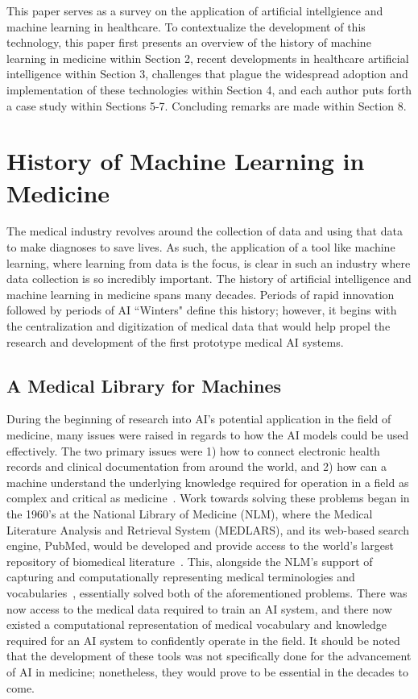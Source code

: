 \documentclass[a4paper]{article}
\begin{document}
This paper serves as a survey on the application of artificial intellgience and machine learning in healthcare. To contextualize the development of this technology, this paper first presents an overview of the history of machine learning in medicine within Section 2, recent developments in healthcare artificial intelligence within Section 3, challenges that plague the widespread adoption and implementation of these technologies within Section 4, and each author puts forth a case study within Sections 5-7. Concluding remarks are made within Section 8.\

\section{History of Machine Learning in Medicine}

The medical industry revolves around the collection of data and using that data to make diagnoses to save lives. As such, the application of a tool like machine learning, where learning from data is the focus, is clear in such an industry where data collection is so incredibly important. The history of artificial intelligence and machine learning in medicine spans many decades. Periods of rapid innovation followed by periods of AI ``Winters" define this history; however, it begins with the centralization and digitization of medical data that would help propel the research and development of the first prototype medical AI systems.

\subsection{A Medical Library for Machines}

During the beginning of research into AI's potential application in the field of medicine, many issues were raised in regards to how the AI models could be used effectively. The two primary issues were 1) how to connect electronic health records and clinical documentation from around the world, and 2) how can a machine understand the underlying knowledge required for operation in a field as complex and critical as medicine~\cite{kulikowski_beginnings_2019}. Work towards solving these problems began in the 1960's at the National Library of Medicine (NLM), where the Medical Literature Analysis and Retrieval System (MEDLARS), and its web-based search engine, PubMed, would be developed and provide access to the world's largest repository of biomedical literature~\cite{kulikowski_beginnings_2019}. This, alongside the NLM's support of capturing and computationally representing medical terminologies and vocabularies~\cite{kulikowski_beginnings_2019}, essentially solved both of the aforementioned problems. There was now access to the medical data required to train an AI system, and there now existed a computational representation of medical vocabulary and knowledge required for an AI system to confidently operate in the field. It should be noted that the development of these tools was not specifically done for the advancement of AI in medicine; nonetheless, they would prove to be essential in the decades to come.
\end{document}
